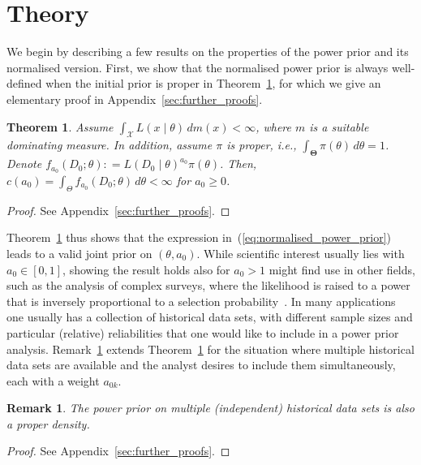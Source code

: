 \documentclass[a4paper, notitlepage, 11pt]{article}
\newtheorem{theorem}{Theorem}[]
\newtheorem{remark}{Remark}[]
\begin{document}
\section{Theory}
\label{sec:theory}

We begin by describing a few results on the properties of the power prior and its normalised version.
First, we show that the normalised power prior is always well-defined when the initial prior is proper in Theorem~\ref{thm:integrability}, for which we give an elementary proof in Appendix~\ref{sec:further_proofs}.

\begin{theorem}
\label{thm:integrability}
 Assume $\int_{\mathcal{X}} L( x \mid \theta)\, dm(x) < \infty$, where $m$ is a suitable dominating measure.
 In addition, assume $\pi$ is proper, i.e., $\int_{\boldsymbol\Theta} \pi(\theta) \, d\theta = 1$.
 Denote $f_{a_0}(D_0;\theta) : = L( D_0 \mid \theta)^{a_0}\pi(\theta)$.
 Then, $c(a_0) = \int_{\Theta} f_{a_0}(D_0;\theta) \, d\theta <\infty$ for $a_0 \geq 0$.
\end{theorem}
\begin{proof}\let\qed\relax
See Appendix~\ref{sec:further_proofs}.
\end{proof}

Theorem~\ref{thm:integrability} thus shows that the expression in~(\ref{eq:normalised_power_prior}) leads to a valid joint prior on $(\theta, a_0)$.
While scientific interest usually lies with $a_0 \in [0, 1]$, showing the result holds also for $a_0 > 1$ might find use in other fields, such as the analysis of complex surveys, where the likelihood is raised to a power that is inversely proportional to a selection probability~\citep{Savitsky2016}.
In many applications one usually has a collection of historical data sets, with different sample sizes and particular (relative) reliabilities that one would like to include in a power prior analysis.
Remark~\ref{rmk:historical} extends Theorem~\ref{thm:integrability} for the situation where multiple historical data sets are available and the analyst desires to include them simultaneously, each with a weight $a_{0k}$.

\begin{remark}
\label{rmk:historical}
 The power prior on multiple (independent) historical data sets is also a proper density.
\end{remark}
\begin{proof}\let\qed\relax
See Appendix~\ref{sec:further_proofs}.
\end{proof}
\end{document}
